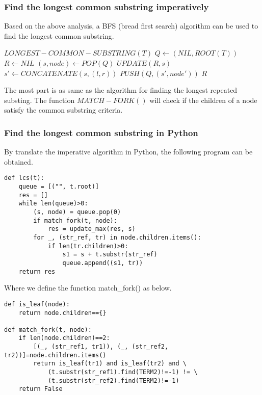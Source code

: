 \documentclass{article}
\begin{document}
\subsubsection{Find the longest common substring imperatively}
Based on the above analysis, a BFS (bread first search) algorithm 
can be used to find the longest common substring.

\begin{algorithmic}
\STATE $LONGEST-COMMON-SUBSTRING(T)$
  \STATE $Q \leftarrow (NIL, ROOT(T))$
  \STATE $R \leftarrow NIL$
    \STATE $(s, node) \leftarrow POP(Q)$
      \STATE $UPDATE(R, s)$
    \ENDIF
        \STATE $s' \leftarrow CONCATENATE(s, (l, r))$
        \STATE $PUSH(Q, (s', node'))$
      \ENDIF
    \ENDFOR
  \ENDWHILE
  \RETURN $R$
\end{algorithmic}

The most part is as same as the algorithm for finding the longest repeated
substing. The function $MATCH-FORK()$ will check if the children of a 
node satisfy the common substring criteria.

\subsubsection*{Find the longest common substring in Python}
By translate the imperative algorithm in Python, the following program can
be obtained.

\lstset{language=Python}
\begin{lstlisting}
def lcs(t):
    queue = [("", t.root)]
    res = []
    while len(queue)>0:
        (s, node) = queue.pop(0)
        if match_fork(t, node):
            res = update_max(res, s)
        for _, (str_ref, tr) in node.children.items():
            if len(tr.children)>0:
                s1 = s + t.substr(str_ref)
                queue.append((s1, tr))
    return res
\end{lstlisting}

Where we define the function match\_fork() as below.

\begin{lstlisting}
def is_leaf(node):
    return node.children=={}

def match_fork(t, node):
    if len(node.children)==2:
        [(_, (str_ref1, tr1)), (_, (str_ref2, tr2))]=node.children.items()
        return is_leaf(tr1) and is_leaf(tr2) and \
            (t.substr(str_ref1).find(TERM2)!=-1) != \
            (t.substr(str_ref2).find(TERM2)!=-1)
    return False
\end{lstlisting}
\end{document}
